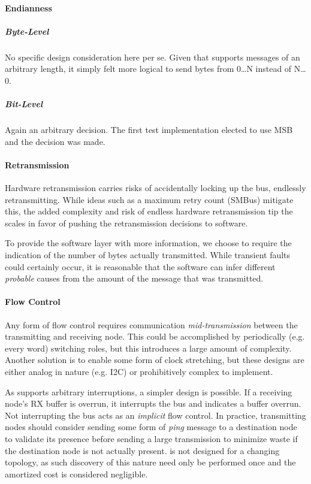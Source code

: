 \paragraph{Endianness}
\subparagraph{Byte-Level}
No specific design consideration here per se. Given that \bus supports
messages of an arbitrary length, it simply felt more logical to send bytes
from 0{\ldots}N instead of N{\ldots}0.
\subparagraph{Bit-Level}
Again an arbitrary decision. The first test implementation elected to use MSB
and the decision was made.

\paragraph{Retransmission}
Hardware retransmission carries risks of accidentally locking up the bus,
endlessly retransmitting. While ideas such as a maximum retry count (SMBus)
mitigate this, the added complexity and risk of endless hardware
retransmission tip the scales in favor of pushing the retransmission decisions
to software.

To provide the software layer with more information, we choose to require the
indication of the number of bytes actually transmitted. While transient faults
could certainly occur, it is reasonable that the software can infer different
{\em probable} causes from the amount of the message that was transmitted.

\paragraph{Flow Control}
Any form of flow control requires communication {\em mid-transmission} between
the transmitting and receiving node. This could be accomplished by
periodically (e.g. every word) switching roles, but this introduces a large
amount of complexity. Another solution is to enable some form of clock
stretching, but these designs are either analog in nature (e.g.  I2C) or
prohibitively complex to implement.

As \bus supports arbitrary interruptions, a simpler design is possible.
If a receiving node's RX buffer is overrun, it interrupts the bus and
indicates a buffer overrun. Not interrupting the bus acts as an {\em implicit}
flow control.
In practice, transmitting nodes should consider sending some form of {\em
ping} message to a destination node to validate its presence before sending a
large transmission to minimize waste if the destination node is not actually
present. \bus is not designed for a changing topology, as such discovery of
this nature need only be performed once and the amortized cost is considered
negligible.

